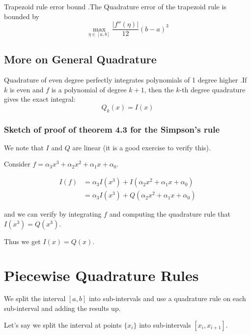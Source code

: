 \documentclass[12pt,letterpaper]{article}
\begin{document}
\begin{theo}{Trapezoid rule error bound}
.The Quadrature error of the trapezoid rule is bounded by
\begin{equation}
	\max_{\eta \in [a,b]} \frac{\left| f''(\eta) \right|}{12} (b-a)^3
\end{equation}
\label{thm:trap_error}
\end{theo}

\subsection{More on General Quadrature}

\begin{theo}{Quadrature of even degree perfectly integrates polynomials of 1 degree higher}
.If $k$ is even and $f$ is a polynomial of degree $k+1$, then the $k$-th degree quadrature gives the exact integral:
\begin{equation}
	Q_k(x) = I(x)
\end{equation}
\end{theo}

\subsubsection*{Sketch of proof of theorem 4.3 for the Simpson's rule}

We note that $I$ and $Q$ are linear (it is a good exercise to verify this).

Consider $f = \alpha_3 x^3 + \alpha_2 x^2 + \alpha_1 x + \alpha_0$.

\begin{align}
	I(f) &= \alpha_3 I(x^3) + I(\alpha_2 x^2 + \alpha_1 x + \alpha_0) \\
	&= \alpha_3 I(x^3) + Q(\alpha_2 x^2 + \alpha_1 x + \alpha_0)
\end{align}

and we can verify by integrating $f$ and computing the quadrature rule that $I(x^3) = Q(x^3)$.

Thus we get $I(x) = Q(x)$.


\section{Piecewise Quadrature Rules}

We split the interval $[a,b]$ into sub-intervals and use a quadrature rule on each sub-interval and adding the results up.

Let's say we split the interval at points $\{x_i\}$ into sub-intervals $[x_i, x_{i+1}]$.
\end{document}
